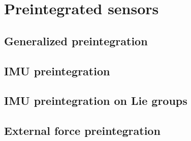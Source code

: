 \chapter{Preintegrated sensors}
\minitoc


\section{Generalized preintegration}
\section{IMU preintegration}
\section{IMU preintegration on Lie groups}
\section{External force preintegration}